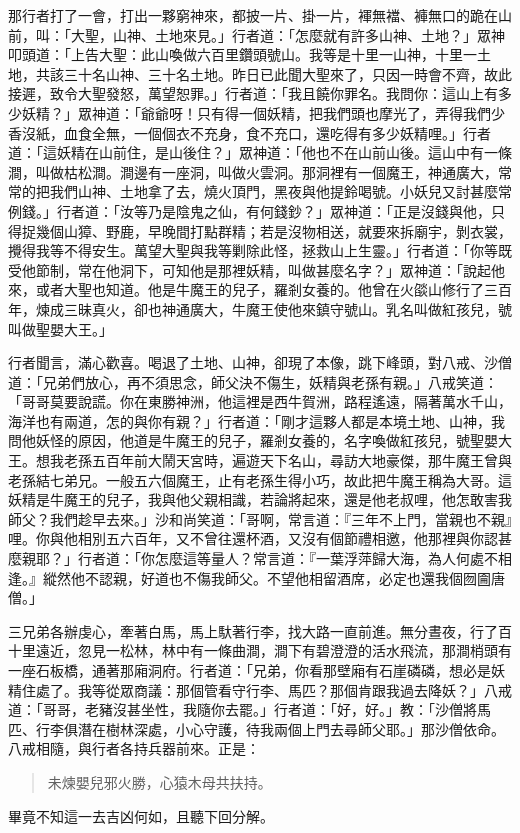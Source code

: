 那行者打了一會，打出一夥窮神來，都披一片、掛一片，褌無襠、褲無口的跪在山前，叫：「大聖，山神、土地來見。」行者道：「怎麼就有許多山神、土地？」眾神叩頭道：「上告大聖：此山喚做六百里鑽頭號山。我等是十里一山神，十里一土地，共該三十名山神、三十名土地。昨日已此聞大聖來了，只因一時會不齊，故此接遲，致令大聖發怒，萬望恕罪。」行者道：「我且饒你罪名。我問你：這山上有多少妖精？」眾神道：「爺爺呀！只有得一個妖精，把我們頭也摩光了，弄得我們少香沒紙，血食全無，一個個衣不充身，食不充口，還吃得有多少妖精哩。」行者道：「這妖精在山前住，是山後住？」眾神道：「他也不在山前山後。這山中有一條澗，叫做枯松澗。澗邊有一座洞，叫做火雲洞。那洞裡有一個魔王，神通廣大，常常的把我們山神、土地拿了去，燒火頂門，黑夜與他提鈴喝號。小妖兒又討甚麼常例錢。」行者道：「汝等乃是陰鬼之仙，有何錢鈔？」眾神道：「正是沒錢與他，只得捉幾個山獐、野鹿，早晚間打點群精；若是沒物相送，就要來拆廟宇，剝衣裳，攪得我等不得安生。萬望大聖與我等剿除此怪，拯救山上生靈。」行者道：「你等既受他節制，常在他洞下，可知他是那裡妖精，叫做甚麼名字？」眾神道：「說起他來，或者大聖也知道。他是牛魔王的兒子，羅剎女養的。他曾在火燄山修行了三百年，煉成三昧真火，卻也神通廣大，牛魔王使他來鎮守號山。乳名叫做紅孩兒，號叫做聖嬰大王。」

行者聞言，滿心歡喜。喝退了土地、山神，卻現了本像，跳下峰頭，對八戒、沙僧道：「兄弟們放心，再不須思念，師父決不傷生，妖精與老孫有親。」八戒笑道：「哥哥莫要說謊。你在東勝神洲，他這裡是西牛賀洲，路程遙遠，隔著萬水千山，海洋也有兩道，怎的與你有親？」行者道：「剛才這夥人都是本境土地、山神，我問他妖怪的原因，他道是牛魔王的兒子，羅剎女養的，名字喚做紅孩兒，號聖嬰大王。想我老孫五百年前大鬧天宮時，遍遊天下名山，尋訪大地豪傑，那牛魔王曾與老孫結七弟兄。一般五六個魔王，止有老孫生得小巧，故此把牛魔王稱為大哥。這妖精是牛魔王的兒子，我與他父親相識，若論將起來，還是他老叔哩，他怎敢害我師父？我們趁早去來。」沙和尚笑道：「哥啊，常言道：『三年不上門，當親也不親』哩。你與他相別五六百年，又不曾往還杯酒，又沒有個節禮相邀，他那裡與你認甚麼親耶？」行者道：「你怎麼這等量人？常言道：『一葉浮萍歸大海，為人何處不相逢。』縱然他不認親，好道也不傷我師父。不望他相留酒席，必定也還我個囫圇唐僧。」

三兄弟各辦虔心，牽著白馬，馬上馱著行李，找大路一直前進。無分晝夜，行了百十里遠近，忽見一松林，林中有一條曲澗，澗下有碧澄澄的活水飛流，那澗梢頭有一座石板橋，通著那廂洞府。行者道：「兄弟，你看那壁廂有石崖磷磷，想必是妖精住處了。我等從眾商議：那個管看守行李、馬匹？那個肯跟我過去降妖？」八戒道：「哥哥，老豬沒甚坐性，我隨你去罷。」行者道：「好，好。」教：「沙僧將馬匹、行李俱潛在樹林深處，小心守護，待我兩個上門去尋師父耶。」那沙僧依命。八戒相隨，與行者各持兵器前來。正是：
\begin{quote}
未煉嬰兒邪火勝，心猿木母共扶持。
\end{quote}

畢竟不知這一去吉凶何如，且聽下回分解。
